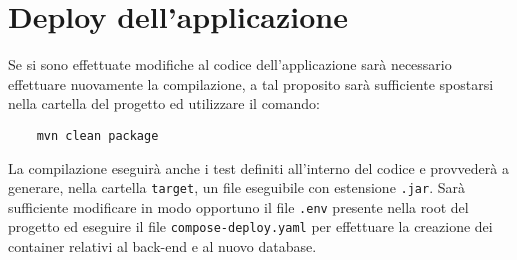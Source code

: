 \section{Deploy dell'applicazione}
Se si sono effettuate modifiche al codice dell'applicazione sarà necessario effettuare nuovamente la compilazione, a tal proposito sarà sufficiente spostarsi nella cartella del progetto ed utilizzare il comando:

\begin{lstlisting}
    mvn clean package
\end{lstlisting}

\noindent
La compilazione eseguirà anche i test definiti all'interno del codice e provvederà a generare, nella cartella \texttt{target}, un file eseguibile con estensione \texttt{.jar}. 
Sarà sufficiente modificare in modo opportuno il file \texttt{.env} presente nella root del progetto ed eseguire il file \texttt{compose-deploy.yaml} per effettuare la creazione dei container relativi al back-end e al nuovo database.